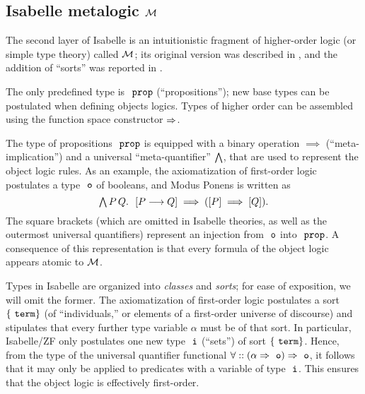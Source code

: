 \subsection{Isabelle metalogic $\mathcal{M}$}
\label{sec:isabelle-metalogic-meta}

The second layer of Isabelle is an
intuitionistic fragment of higher-order logic (or simple type theory)
called $\mathcal{M}$; its original version was described in \cite{Paulson1989},
and the addition of “sorts” was reported in \cite{Nipkow-LF-91}.

The only predefined type is $\prop$ (“propositions”); new base types
can be postulated when defining objects logics. Types of higher order can be
assembled using the function space constructor $\Rightarrow$.

The type of propositions $\prop$ is equipped with a binary operation
${\implies}$ (“meta-implication”) and a universal “meta-quantifier”
$\textstyle\bigwedge$, that are used to represent the object
logic rules. As an example, the axiomatization of first-order logic
postulates a type $\tyo$ of booleans, and Modus Ponens
is written as
\begin{equation}\label{eq:modus-ponens}
  \textstyle\bigwedge P\,Q.\ \ [P\longrightarrow Q] \implies ([P] \implies [Q]).
\end{equation}
The square brackets (which are omitted in Isabelle theories, as well
as the outermost universal quantifiers) represent
an injection from $\tyo$ into $\prop$. %
A consequence of this representation is that every formula of
the object logic appears atomic to $\mathcal{M}$.

Types in Isabelle are organized into \emph{classes} and \emph{sorts};
for ease of exposition, we will omit the former.  The axiomatization
of first-order logic postulates a sort $\{\type{term}\}$ (of
“individuals,” or elements of a first-order universe of discourse) and
stipulates that every further type variable $\alpha$ must be of that
sort. In particular, Isabelle/ZF only postulates one new type $\tyi$
(“sets”) of sort $\{\type{term}\}$. Hence, from the type of the universal
quantifier functional $\forall :: (\alpha \fun \tyo) \fun \tyo$, it
follows that it may only be applied to predicates with a variable of
type $\tyi$. This ensures that the object logic is effectively
first-order.

